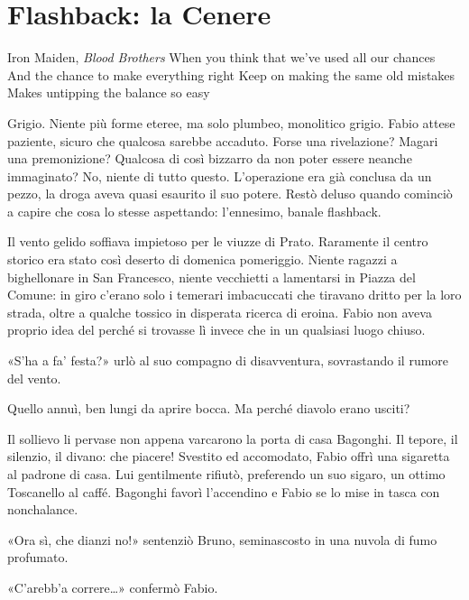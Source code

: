 \chapter{Flashback: la Cenere}

\begin{chapquote}{Iron Maiden, \textit{Blood Brothers}}
	When you think that we've used all our chances\newline
	And the chance to make everything right\newline
	Keep on making the same old mistakes\newline
	Makes untipping the balance so easy
\end{chapquote}


Grigio. Niente più forme eteree, ma solo plumbeo, monolitico grigio. Fabio attese paziente, sicuro che qualcosa sarebbe accaduto. Forse una rivelazione? Magari una premonizione? Qualcosa di così bizzarro da non poter essere neanche immaginato? No, niente di tutto questo. L'operazione era già conclusa da un pezzo, la droga aveva quasi esaurito il suo potere. Restò deluso quando cominciò a capire che cosa lo stesse aspettando: l'ennesimo, banale flashback.

Il vento gelido soffiava impietoso per le viuzze di Prato. Raramente il centro storico era stato così deserto di domenica pomeriggio. Niente ragazzi a bighellonare in San Francesco, niente vecchietti a lamentarsi in Piazza del Comune: in giro c'erano solo i temerari imbacuccati che tiravano dritto per la loro strada, oltre a qualche tossico in disperata ricerca di eroina. Fabio non aveva proprio idea del perché si trovasse lì invece che in un qualsiasi luogo chiuso.

«S'ha a fa' festa?» urlò al suo compagno di disavventura, sovrastando il rumore del vento.

Quello annuì, ben lungi da aprire bocca. Ma perché diavolo erano usciti?

Il sollievo li pervase non appena varcarono la porta di casa Bagonghi. Il tepore, il silenzio, il divano: che piacere! Svestito ed accomodato, Fabio offrì una sigaretta al padrone di casa. Lui gentilmente rifiutò, preferendo un suo sigaro, un ottimo Toscanello al caffé. Bagonghi favorì l'accendino e Fabio se lo mise in tasca con nonchalance.

«Ora sì, che dianzi no!» sentenziò Bruno, seminascosto in una nuvola di fumo profumato.

«C'arebb'a correre\ldots» confermò Fabio.

